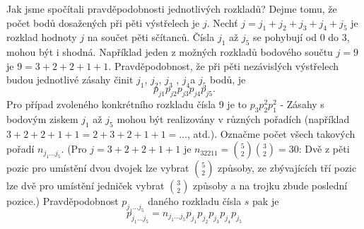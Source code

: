 \begin{mdframed}[style=mdexam]
\begin{example}
    Jak jsme spočítali pravděpodobnosti jednotlivých rozkladů? Dejme tomu, že počet bodů dosažených
    při pěti výstřelech je \(j\). Nechť \(j = j_1 + j_2 + j_3 + j_4 + j_5\) je rozklad hodnoty \(j\)
    na součet pěti sčítanců. Čísla \(j_1\) až \(j_5\) se pohybují od \num{0} do \num{3}, mohou být i
    shodná. Například jeden z možných rozkladů bodového součtu \(j = 9\) je \(9 = 3 + 2 + 2 + 1 +
    1\). Pravděpodobnost, že při pěti nezávislých výstřelech budou jednotlivé zásahy činit \(j_1\),
    \(j_2\), \(j_3\) , \(j_4\)a \(j_5\) bodů, je
    \begin{equation*}
      p_{j1}p_{j2}p_{j3}p_{j4}p_{j5}.
    \end{equation*}
    Pro případ zvoleného konkrétního rozkladu čísla \num{9} je to \(p_3p_2^2p_1^2\) - Zásahy s
    bodovým ziskem \(j_1\) až \(j_5\) mohou být realizovány v různých pořadích (například \(\num{3}
    + \num{2} + \num{2} + \num{1} + \num{1} = \num{2} + \num{3} + \num{2} + \num{1} + \num{1}
    =\ldots\), atd.). Označme počet všech takových pořadí \(n_{j_1\ldots j_5}\). (Pro \(j = \num{3}
    + \num{2} + \num{2} + \num{1} + \num{1}\) je \(n_{32211} = \binom{5}{2}\binom{3}{2} = 30\): Dvě
    z pěti pozic pro umístění dvou dvojek lze vybrat \(\binom{5}{2}\) způsoby, ze zbývajících tří
    pozic lze dvě pro umístění jedniček vybrat \(\binom{3}{2}\) způsoby a na trojku zbude poslední
    pozice.) Pravděpodobnost \(p_{j_1\ldots j_5}\) daného rozkladu čísla \(s\) pak je
    \begin{equation*}
      p_{j_1\ldots j_5} = n_{j_1\ldots j_5}p_{j_1}p_{j_2}p_{j_3}p_{j_4}p_{j_5}
    \end{equation*}


\end{example}
\end{mdframed}
